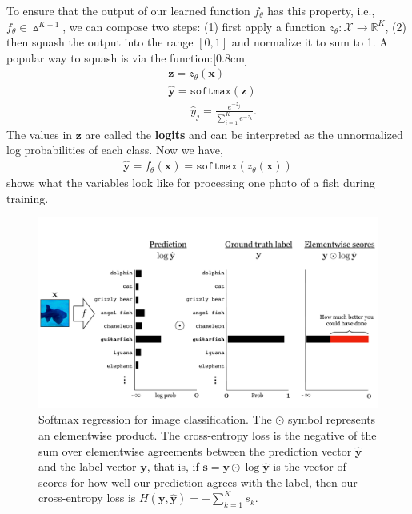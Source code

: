 To ensure that the output of our learned function $f_{\theta}$ has this property, i.e., $f_{\theta} \in \vartriangle^{K-1}$, we can compose two steps: (1) first apply a function $z_{\theta}: \mathcal{X} \rightarrow \mathbb{R}^K$, (2) then squash the output into the range $[0,1]$ and normalize it to sum to 1.
A popular way to squash is via the  function:[0.8cm]
\begin{align}
     & \mathbf{z} = z_{\theta}(\mathbf{x})                             \\
     & \hat{\mathbf{y}} = \texttt{softmax}(\mathbf{z})                 \\
     & \quad \quad \hat{y}_j = \frac{e^{-z_j}}{\sum_{i=1}^K e^{-z_k}}.
\end{align}
The values in $\mathbf{z}$ are called the \textbf{logits} and can be interpreted as the unnormalized log probabilities of each class.
Now we have,
\begin{align}
    \hat{\mathbf{y}} = f_{\theta}(\mathbf{x}) = \texttt{softmax}(z_{\theta}(\mathbf{x}))
\end{align}
\Fig{\ref{fig:softmax_regression_diagram}} shows what the variables look like for processing one photo of a fish during training.

\begin{figure}[h]
    \centering
    \includegraphics[width=1.0\linewidth]{./figures/intro_to_learning/softmax_regression_diagram.pdf}
    \caption{Softmax regression for image classification. The $\odot$ symbol represents an elementwise product. The cross-entropy loss is the negative of the sum over elementwise agreements between the prediction vector $\hat{\mathbf{y}}$ and the label vector $\mathbf{y}$, that is, if $\mathbf{s} = \mathbf{y} \odot \log \hat{\mathbf{y}}$ is the vector of scores for how well our prediction agrees with the label, then our cross-entropy loss is $H(\mathbf{y}, \hat{\mathbf{y}}) = - \sum_{k=1}^K s_k$.}
    \label{fig:softmax_regression_diagram}
\end{figure}

